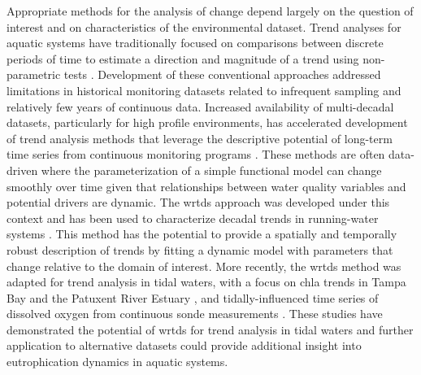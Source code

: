 \documentclass[journal = esthag, manuscript = article]{achemso}\usepackage[]{graphicx}\usepackage[]{color}
\begin{document}
Appropriate methods for the analysis of change depend largely on the question of interest and on characteristics of the environmental dataset.  Trend analyses for aquatic systems have traditionally focused on comparisons between discrete periods of time to estimate a direction and magnitude of a trend using non-parametric tests \cite{Hirsch91,Esterby96}. Development of these conventional approaches addressed limitations in historical monitoring datasets related to infrequent sampling and relatively few years of continuous data. Increased availability of multi-decadal datasets, particularly for high profile environments, has accelerated development of trend analysis methods that leverage the descriptive potential of long-term time series from continuous monitoring programs \cite{Bowes09,Halliday12}. These methods are often data-driven where the parameterization of a simple functional model can change smoothly over time given that relationships between water quality variables and potential drivers are dynamic.  The \ac{wrtds} approach was developed under this context and has been used to characterize decadal trends in running-water systems \cite{Hirsch10,Sprague11,Medalie12,Hirsch14,Zhang16}. This method has the potential to provide a spatially and temporally robust description of trends by fitting a dynamic model with parameters that change relative to the domain of interest.  More recently, the \ac{wrtds} method was adapted for trend analysis in tidal waters, with a focus on \ac{chla} trends in Tampa Bay \cite{Beck15} and the Patuxent River Estuary \cite{BeckIP}, and tidally-influenced time series of dissolved oxygen from continuous sonde measurements \cite{Beck15b}. These studies have demonstrated the potential of \ac{wrtds} for trend analysis in tidal waters and further application to alternative datasets could provide additional insight into eutrophication dynamics in aquatic systems. 
\end{document}
